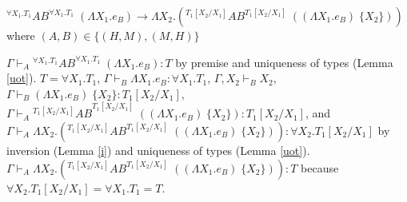 \begin{case}
$^{\forall X_{1}.T_{1}}AB^{\forall X_{1}.T_{1}}\;(\Lambda X_{1}.e_{B})\rightarrow\Lambda X_{2}.(^{T_{1}[X_{2}/X_{1}]}AB^{T_{1}[X_{2}/X_{1}]}\;((\Lambda X_{1}.e_{B})\;\lbrace X_{2}\rbrace))$ where $(A,B)\in\lbrace(H,M),(M,H)\rbrace$

$\Gamma\vdash_{A}{^{\forall X_{1}.T_{1}}A}B^{\forall X_{1}.T_{1}}\;(\Lambda X_{1}.e_{B}):T$ by premise and uniqueness of types (Lemma \ref{uot}).  $T=\forall X_{1}.T_{1}$, $\Gamma\vdash_{B}\Lambda X_{1}.e_{B}:\forall X_{1}.T_{1}$, $\Gamma,X_{2}\vdash_{B}X_{2}$, $\Gamma\vdash_{B}(\Lambda X_{1}.e_{B})\;\lbrace X_{2}\rbrace:T_{1}[X_{2}/X_{1}]$, $\Gamma\vdash_{A}{^{T_{1}[X_{2}/X_{1}]}AB}^{T_{1}[X_{2}/X_{1}]}\;((\Lambda X_{1}.e_{B})\;\lbrace X_{2}\rbrace):T_{1}[X_{2}/X_{1}]$, and $\Gamma\vdash_{A}\Lambda X_{2}.(^{T_{1}[X_{2}/X_{1}]}AB^{T_{1}[X_{2}/X_{1}]}\;((\Lambda X_{1}.e_{B})\;\lbrace X_{2}\rbrace)):\forall X_{2}.T_{1}[X_{2}/X_{1}]$ by inversion (Lemma \ref{i}) and uniqueness of types (Lemma \ref{uot}).  $\Gamma\vdash_{A}\Lambda X_{2}.(^{T_{1}[X_{2}/X_{1}]}AB^{T_{1}[X_{2}/X_{1}]}\;((\Lambda X_{1}.e_{B})\;\lbrace X_{2}\rbrace)):T$ because $\forall X_{2}.T_{1}[X_{2}/X_{1}]=\forall X_{1}.T_{1}=T$.
\end{case}